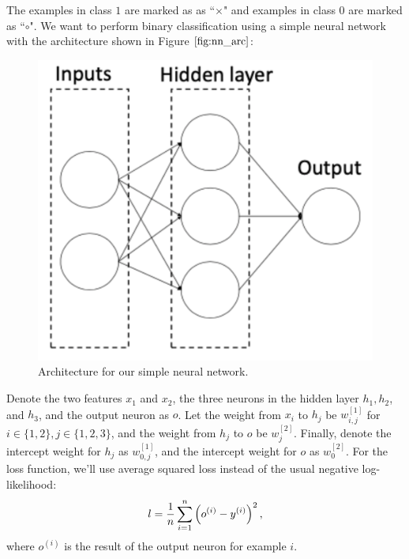 The examples in class $1$ are marked as as ``$\times$" and examples in class $0$ are marked as ``$\circ$". We want to perform binary classification using a simple neural network with the architecture shown in Figure $\ref{fig:nn_arc}$:
\begin{figure}[htbp]
    \centering
    \includegraphics[scale=0.3, clip]{simple_nn/nn_architecture.png}
    \caption{Architecture for our simple neural network.}
     \label{fig:nn_arc}
\end{figure}

Denote the two features $x_1$ and $x_2$, the three neurons in the hidden layer $h_1, h_2$, and $h_3$, and the output neuron as $o$. Let the weight from $x_i$ to $h_j$ be $w_{i, j}^{[1]}$ for $i \in \{1, 2\}, j \in \{1, 2, 3\}$, and the weight from $h_j$ to $o$ be $w_{j}^{[2]}$. Finally, denote the intercept weight for $h_j$ as $w_{0, j}^{[1]}$, and the intercept weight for $o$ as $w_{0}^{[2]}$. For the loss function, we'll use average squared loss instead of the usual negative log-likelihood:
$$l = \frac{1}{{n}}\sum_{i=1}^{{n}} \left(o^{(i)} - y^{(i)}\right)^2,$$
where $o^{(i)}$ is the result of the output neuron for example $i$.

\begin{enumerate}
  

\ifnum{} {
  
} \fi

  

\ifnum{} {
  
} \fi

  
\ifnum{} {
  
} \fi


\end{enumerate}
